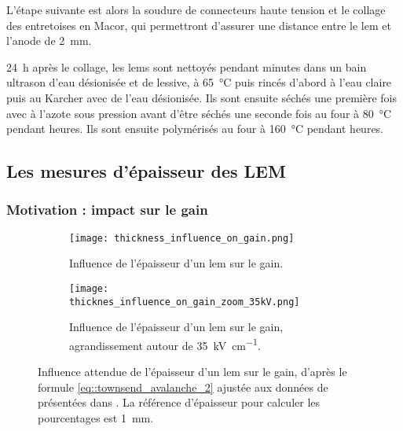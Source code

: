             L'étape suivante est alors la soudure de connecteurs haute tension et le collage des entretoises en Macor, qui permettront d'assurer une distance entre le \gls{lem} et l'anode de \SI{2}{\milli\meter}.
            
            \SI{24}{\hour} après le collage, les \glspl{lem} sont nettoyés pendant  minutes dans un bain ultrason d'eau désionisée et de lessive, à \SI{65}{\celsius} puis rincés d'abord à l'eau claire puis au Karcher avec de l'eau désionisée. Ils sont ensuite séchés une première fois avec à l'azote sous pression avant d'être séchés une seconde fois au four à \SI{80}{\celsius} pendant  heures. Ils sont ensuite polymérisés au four à \SI{160}{\celsius} pendant  heures.
        
        \subsection{Les mesures d’épaisseur des LEM}\label{sec::epaisseur}
        
            \subsubsection{Motivation : impact sur le gain}
            
                \begin{figure}[htbp]
                    \begin{subfigure}[t]{0.48\textwidth}
                        \texttt{[image: thickness\_influence\_on\_gain.png]}
                        \caption{Influence de l'épaisseur d'un \gls{lem} sur le gain.}
                    \end{subfigure}
                    \hfill
                    \begin{subfigure}[t]{0.48\textwidth}
                        \texttt{[image: thicknes\_influence\_on\_gain\_zoom\_35kV.png]}
                        \caption{Influence de l'épaisseur d'un \gls{lem} sur le gain, agrandissement autour de \SI{35}{\kilo\volt\per\centi\meter}.}
                    \end{subfigure}
                    \caption[Influence de l'épaisseur d'un \gls{lem} sur le gain.]{Influence attendue de l'épaisseur d'un \gls{lem} sur le gain, d'après le formule \eqref{eq::townsend_avalanche_2} ajustée aux données de présentées dans \cite{Cantini2014}. La référence d'épaisseur pour calculer les pourcentages est \SI{1}{\milli\meter}.}
                    \label{fig::thickness_influence_on_gain}
                \end{figure}
            
